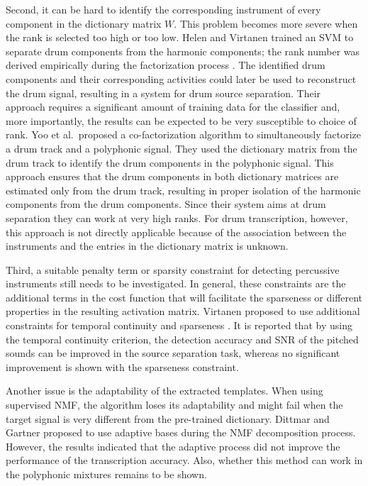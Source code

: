 \documentclass{article}
\begin{document}
Second, it can be hard to identify the corresponding instrument of every component in the dictionary matrix $W$. This problem becomes more severe when the rank is selected too high or too low. Helen and Virtanen trained an SVM to separate drum components from the harmonic components; the rank number was derived empirically during the factorization process \cite{helen_separation_2005}. The identified drum components and their corresponding activities could later be used to reconstruct the drum signal, resulting in a system for drum source separation. Their approach requires a significant amount of training data for the classifier and, more importantly, the results can be expected to be very susceptible to choice of rank. Yoo et al.\ proposed a co-factorization algorithm \cite{yoo_nonnegative_2010} to simultaneously factorize a drum track and a polyphonic signal. They used the dictionary matrix from the drum track to identify the drum components in the polyphonic signal. This approach ensures that the drum components in both dictionary matrices are estimated only from the drum track, resulting in proper isolation of the harmonic components from the drum components. Since their system aims at drum separation they can work at very high ranks. For drum transcription, however, this approach is not directly applicable because of the association between the instruments and the entries in the dictionary matrix is unknown.  

Third, a suitable penalty term or sparsity constraint for detecting percussive instruments still needs to be investigated. In general, these constraints are the additional terms in the cost function that will facilitate the sparseness or different properties in the resulting activation matrix. Virtanen proposed to use additional constraints for temporal continuity and sparseness \cite{virtanen_ssnmf_2007}. It is reported that by using the temporal continuity criterion, the detection accuracy and SNR of the pitched sounds can be improved in the source separation task, whereas no significant improvement is shown with the sparseness constraint. 

Another issue is the adaptability of the extracted templates. When using supervised NMF, the algorithm loses its adaptability and might fail when the target signal is very different from the pre-trained dictionary. Dittmar and Gartner proposed to use adaptive bases during the NMF decomposition process\cite{Dittmar2014}. However, the results indicated that the adaptive process did not improve the performance of the transcription accuracy. Also, whether this method can work in the polyphonic mixtures remains to be shown. 
\end{document}
